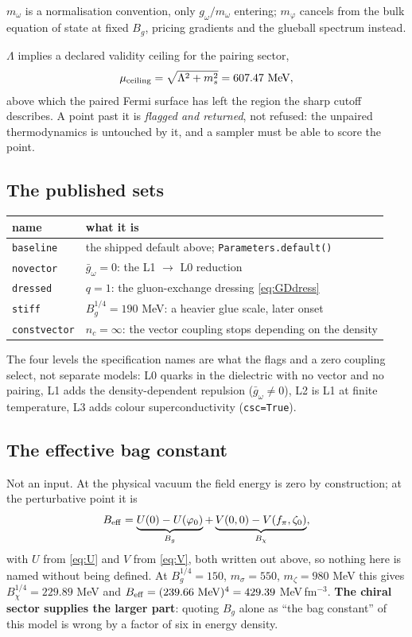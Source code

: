 \documentclass[11pt,a4paper]{article}
\newcommand{\code}[1]{\texttt{#1}}
\begin{document}
$m_\omega$ is a normalisation convention, only $g_\omega/m_\omega$ entering;
$m_\varphi$ cancels from the bulk equation of state at fixed $B_g$, pricing
gradients and the glueball spectrum instead.

$\Lambda$ implies a declared validity ceiling for the pairing sector,
\begin{equation}
\mu_{\rm ceiling} = \sqrt{\Lambda^2+m_s^2} = 607.47\ \text{MeV},
\end{equation}
above which the paired Fermi surface has left the region the sharp cutoff
describes. A point past it is \emph{flagged and returned}, not refused: the
unpaired thermodynamics is untouched by it, and a sampler must be able to score
the point.

\subsection{The published sets}

\begin{center}
\begin{tabular}{ll}
\toprule
name & what it is \\
\midrule
\code{baseline} & the shipped default above; \code{Parameters.default()} \\
\code{novector} & $\bar g_\omega=0$: the L1 $\to$ L0 reduction \\
\code{dressed}  & $q=1$: the gluon-exchange dressing \eqref{eq:GDdress} \\
\code{stiff}    & $B_g^{1/4}=190$ MeV: a heavier glue scale, later onset \\
\code{constvector} & $n_c=\infty$: the vector coupling stops depending on the density \\
\bottomrule
\end{tabular}
\end{center}

The four levels the specification names are what the flags and a zero coupling
select, not separate models: L0 quarks in the dielectric with no vector and no
pairing, L1 adds the density-dependent repulsion ($\bar g_\omega\neq0$), L2 is
L1 at finite temperature, L3 adds colour superconductivity (\code{csc=True}).

\subsection{The effective bag constant}
\label{sec:bag}

Not an input. At the physical vacuum the field energy is zero by construction;
at the perturbative point it is
\begin{equation}
B_{\rm eff} = \underbrace{U(0)-U(\varphi_0)}_{B_g}
 + \underbrace{V(0,0)-V(f_\pi,\zeta_0)}_{B_\chi},
\end{equation}
with $U$ from \eqref{eq:U} and $V$ from \eqref{eq:V}, both written out above,
so nothing here is named without being defined. At $B_g^{1/4}=150$,
$m_\sigma=550$, $m_\zeta=980$ MeV this gives $B_\chi^{1/4}=229.89$ MeV and
$B_{\rm eff}=(239.66\ \mathrm{MeV})^4=429.39$ MeV\,fm$^{-3}$.
\textbf{The chiral sector supplies the larger part}: quoting $B_g$ alone as
``the bag constant'' of this model is wrong by a factor of six in energy
density.
\end{document}
